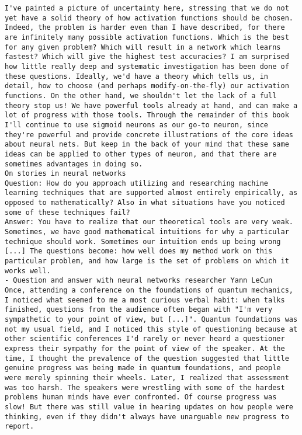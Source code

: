 \begin{lstlisting}
I've painted a picture of uncertainty here, stressing that we do not yet have a solid theory of how activation functions should be chosen. Indeed, the problem is harder even than I have described, for there are infinitely many possible activation functions. Which is the best for any given problem? Which will result in a network which learns fastest? Which will give the highest test accuracies? I am surprised how little really deep and systematic investigation has been done of these questions. Ideally, we'd have a theory which tells us, in detail, how to choose (and perhaps modify-on-the-fly) our activation functions. On the other hand, we shouldn't let the lack of a full theory stop us! We have powerful tools already at hand, and can make a lot of progress with those tools. Through the remainder of this book I'll continue to use sigmoid neurons as our go-to neuron, since they're powerful and provide concrete illustrations of the core ideas about neural nets. But keep in the back of your mind that these same ideas can be applied to other types of neuron, and that there are sometimes advantages in doing so.
On stories in neural networks
Question: How do you approach utilizing and researching machine learning techniques that are supported almost entirely empirically, as opposed to mathematically? Also in what situations have you noticed some of these techniques fail?
Answer: You have to realize that our theoretical tools are very weak. Sometimes, we have good mathematical intuitions for why a particular technique should work. Sometimes our intuition ends up being wrong [...] The questions become: how well does my method work on this particular problem, and how large is the set of problems on which it works well.
- Question and answer with neural networks researcher Yann LeCun
Once, attending a conference on the foundations of quantum mechanics, I noticed what seemed to me a most curious verbal habit: when talks finished, questions from the audience often began with "I'm very sympathetic to your point of view, but [...]". Quantum foundations was not my usual field, and I noticed this style of questioning because at other scientific conferences I'd rarely or never heard a questioner express their sympathy for the point of view of the speaker. At the time, I thought the prevalence of the question suggested that little genuine progress was being made in quantum foundations, and people were merely spinning their wheels. Later, I realized that assessment was too harsh. The speakers were wrestling with some of the hardest problems human minds have ever confronted. Of course progress was slow! But there was still value in hearing updates on how people were thinking, even if they didn't always have unarguable new progress to report.

\end{lstlisting}
